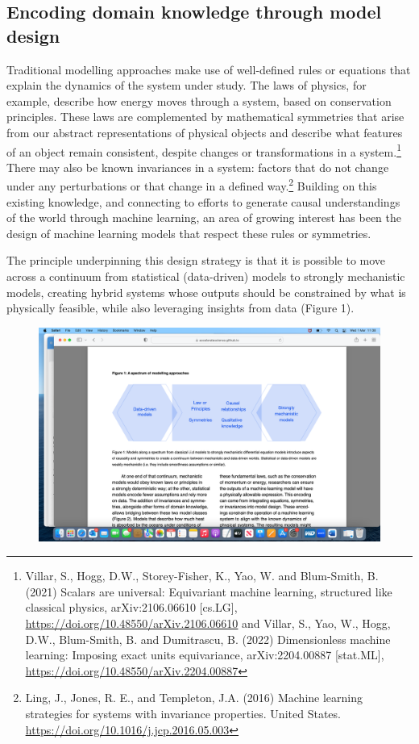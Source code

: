 \hypertarget{encoding-domain-knowledge-through-model-design}{%
\subsection{Encoding domain knowledge through model
design}\label{encoding-domain-knowledge-through-model-design}}

Traditional modelling approaches make use of well-defined rules or
equations that explain the dynamics of the system under study. The laws
of physics, for example, describe how energy moves through a system,
based on conservation principles. These laws are complemented by
mathematical symmetries that arise from our abstract representations of
physical objects and describe what features of an object remain
consistent, despite changes or transformations in a system.\footnote{Villar,
  S., Hogg, D.W., Storey-Fisher, K., Yao, W. and Blum-Smith, B. (2021)
  Scalars are universal: Equivariant machine learning, structured like
  classical physics, arXiv:2106.06610 {[}cs.LG{]},
  \href{https://doi.org/10.48550/arXiv.2106.06610}{\uline{https://doi.org/10.48550/arXiv.2106.06610}}
  and Villar, S., Yao, W., Hogg, D.W., Blum-Smith, B. and Dumitrascu, B.
  (2022) Dimensionless machine learning: Imposing exact units
  equivariance, arXiv:2204.00887 {[}stat.ML{]},
  \href{https://doi.org/10.48550/arXiv.2204.00887}{\uline{https://doi.org/10.48550/arXiv.2204.00887}}}
There may also be known invariances in a system: factors that do not
change under any perturbations or that change in a defined
way.\footnote{Ling, J., Jones, R. E., and Templeton, J.A. (2016) Machine
  learning strategies for systems with invariance properties. United
  States.
  \href{https://doi.org/10.1016/j.jcp.2016.05.003}{\uline{https://doi.org/10.1016/j.jcp.2016.05.003}}}
Building on this existing knowledge, and connecting to efforts to
generate causal understandings of the world through machine learning, an
area of growing interest has been the design of machine learning models
that respect these rules or symmetries.

The principle underpinning this design strategy is that it is possible
to move across a continuum from statistical (data-driven) models to
strongly mechanistic models, creating hybrid systems whose outputs
should be constrained by what is physically feasible, while also
leveraging insights from data (Figure 1).

\includegraphics[width=5.95833in,height=2.7581in]{media/image1.png}

